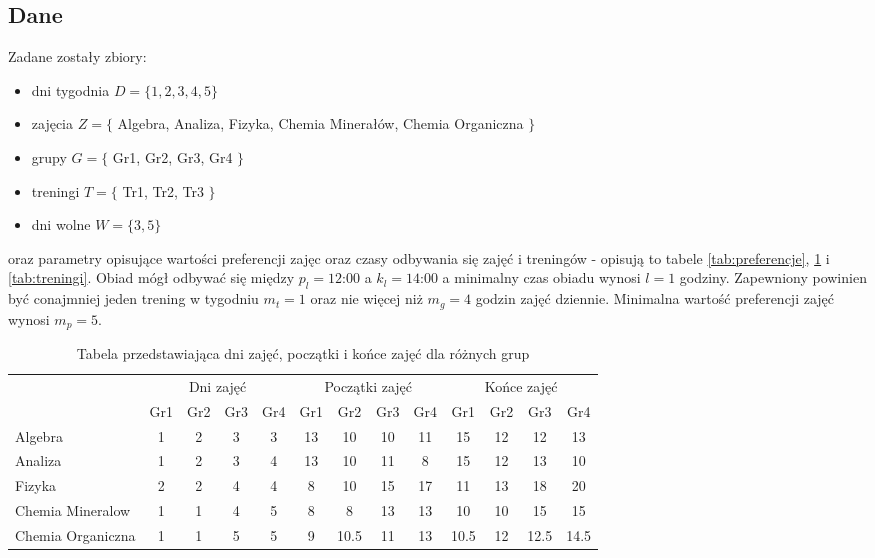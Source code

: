 \documentclass{article}
\begin{document}
\subsection{Dane}
Zadane zostały zbiory:
\begin{itemize}
    \item dni tygodnia $D = \{1,2,3,4,5\}$
    \item zajęcia $Z = \{$ Algebra, Analiza, Fizyka, Chemia Minerałów, Chemia Organiczna $\}$
    \item grupy $G = \{$ Gr1, Gr2, Gr3, Gr4 $\}$
    \item treningi $T = \{$ Tr1, Tr2, Tr3 $\}$
    \item dni wolne $W = \{3,5\}$
\end{itemize}
oraz parametry opisujące wartości preferencji zajęc oraz czasy odbywania się zajęć i treningów - opisują to tabele \ref{tab:preferencje}, \ref{tab:zajecia} i \ref{tab:treningi}.
Obiad mógł odbywać się między $p_l = \textit{12:00}$ a $k_l = \textit{14:00}$ a minimalny czas obiadu wynosi $l = \textit{1}$ godziny. Zapewniony powinien być conajmniej jeden trening w tygodniu $m_t = \textit{1}$ oraz nie więcej niż $m_g = \textit{4}$ godzin zajęć dziennie. Minimalna wartość preferencji zajęć wynosi $m_p = \textit{5}$.
\begin{table}[h]
    \centering
    \begin{tabular}{l|cccc|cccc|cccc}
        & \multicolumn{4}{c}{Dni zajęć} & \multicolumn{4}{c}{Początki zajęć} & \multicolumn{4}{c}{Końce zajęć} \\
        & Gr1 & Gr2 & Gr3 & Gr4 & Gr1 & Gr2 & Gr3 & Gr4 & Gr1 & Gr2 & Gr3 & Gr4 \\
        \hline
        Algebra & 1 & 2 & 3 & 3 & 13 & 10 & 10 & 11 & 15 & 12 & 12 & 13 \\
        Analiza & 1 & 2 & 3 & 4 & 13 & 10 & 11 & 8 & 15 & 12 & 13 & 10 \\
        Fizyka & 2 & 2 & 4 & 4 & 8 & 10 & 15 & 17 & 11 & 13 & 18 & 20 \\
        Chemia Mineralow & 1 & 1 & 4 & 5 & 8 & 8 & 13 & 13 & 10 & 10 & 15 & 15 \\
        Chemia Organiczna & 1 & 1 & 5 & 5 & 9 & 10.5 & 11 & 13 & 10.5 & 12 & 12.5 & 14.5 \\
    \end{tabular}
    \caption{Tabela przedstawiająca dni zajęć, początki i końce zajęć dla różnych grup}
    \label{tab:zajecia}
\end{table}
\end{document}
